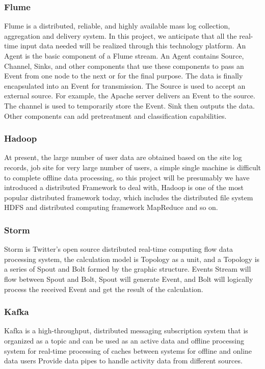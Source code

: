 \documentclass[sigconf]{acmart}
\begin{document}
\subsubsection{Flume}
Flume is a distributed, reliable, and highly available mass log collection, aggregation and delivery system. In this project, we anticipate that all the real-time input data needed will be realized through this technology platform. An Agent is the basic component of a Flume stream.\cite{CF2017}  An Agent contains Source, Channel, Sinks, and other components that use these components to pass an Event from one node to the next or for the final purpose. The data is finally encapsulated into an Event for transmission. The Source is used to accept an external source.\cite{CF2017}  For example, the Apache server delivers an Event to the source. The channel is used to temporarily store the Event. Sink then outputs the data. Other components can add pretreatment and classification capabilities.

\subsubsection{Hadoop}
At present, the large number of user data are obtained based on the site log records, job site for very large number of users, a simple single machine is difficult to complete offline data processing, so this project will be presumably we have introduced a distributed Framework to deal with, Hadoop is one of the most popular distributed framework today, which includes the distributed file system HDFS and distributed computing framework MapReduce and so on.


\subsubsection{Storm}
Storm is Twitter's open source distributed real-time computing flow data processing system, the calculation model is Topology as a unit, and a Topology is a series of Spout and Bolt formed by the graphic structure. Events Stream will flow between Spout and Bolt, Spout will generate Event, and Bolt will logically process the received Event and get the result of the calculation.


\subsubsection{Kafka}
Kafka is a high-throughput, distributed messaging subscription system that is organized as a topic and can be used as an active data and offline processing system for real-time processing of caches between systems for offline and online data users Provide data pipes to handle activity data from different sources.\cite{CBF2017} 
\end{document}
